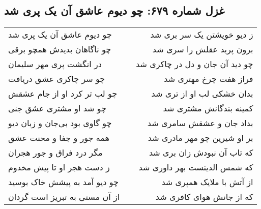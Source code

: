 \begin{center}
\section*{غزل شماره ۶۷۹: چو دیوم عاشق آن یک پری شد}
\label{sec:0679}
\begin{longtable}{l p{0.5cm} r}
چو دیوم عاشق آن یک پری شد
&&
ز دیو خویشتن یک سر بری شد
\\
چو ناگاهان بدیدش همچو برقی
&&
برون پرید عقلش را سری شد
\\
در انگشت پری مهر سلیمان
&&
چو دید آن جان و دل در چاکری شد
\\
چو سر چاکری عشق دریافت
&&
فراز هفت چرخ مهتری شد
\\
چو لب تر کرد او از جام عشقش
&&
بدان خشکی لب او از تری شد
\\
چو شد او مشتری عشق جنی
&&
کمینه بندگانش مشتری شد
\\
چو گاوی بود بی‌جان و زبان دیو
&&
بداد جان و عشقش سامری شد
\\
همه جور و جفا و محنت عشق
&&
بر او شیرین چو مهر مادری شد
\\
مگر درد فراق و جور هجران
&&
که تاب آن نبودش زان بری شد
\\
ز دست هجر او تا پیش مخدوم
&&
که شمس الدینست بهر داوری شد
\\
چو دیو آمد به پیشش خاک بوسید
&&
از آتش با ملایک همپری شد
\\
از آن مستی به تبریز است گردان
&&
که از جانش هوای کافری شد
\\
\end{longtable}
\end{center}
